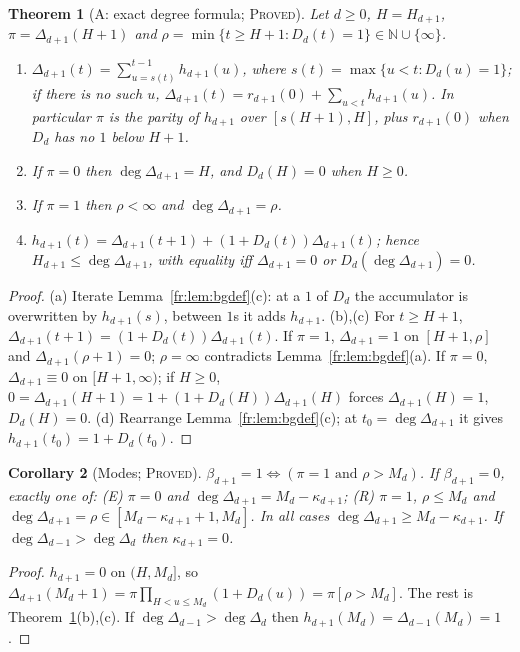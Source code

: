 \documentclass[11pt]{article}
\newtheorem{theorem}{Theorem}[section]
\newtheorem{corollary}[theorem]{Corollary}
\theoremstyle{definition}
\theoremstyle{remark}
\newcommand{\N}{\mathbb{N}}
\newcommand{\PROVED}{\textsc{Proved}}
\begin{document}
\begin{theorem}[A: exact degree formula; \PROVED]\label{fr:thm:A}
Let $d\ge0$, $H=H_{d+1}$, $\pi=\Delta_{d+1}(H+1)$ and $\rho=\min\{t\ge H+1:D_d(t)=1\}\in\N\cup\{\infty\}$.
\begin{enumerate}
\item[(a)] $\Delta_{d+1}(t)=\sum_{u=s(t)}^{t-1}h_{d+1}(u)$, where $s(t)=\max\{u<t:D_d(u)=1\}$;
if there is no such $u$, $\Delta_{d+1}(t)=r_{d+1}(0)+\sum_{u<t}h_{d+1}(u)$.
In particular $\pi$ is the parity of $h_{d+1}$ over $[s(H+1),H]$, plus $r_{d+1}(0)$ when $D_d$ has no $1$ below $H+1$.
\item[(b)] If $\pi=0$ then $\deg\Delta_{d+1}=H$, and $D_d(H)=0$ when $H\ge0$.
\item[(c)] If $\pi=1$ then $\rho<\infty$ and $\deg\Delta_{d+1}=\rho$.
\item[(d)] $h_{d+1}(t)=\Delta_{d+1}(t+1)+(1+D_d(t))\Delta_{d+1}(t)$; hence
$H_{d+1}\le\deg\Delta_{d+1}$, with equality iff $\Delta_{d+1}=0$ or $D_d(\deg\Delta_{d+1})=0$.
\end{enumerate}
\end{theorem}
\begin{proof}
(a) Iterate Lemma~\ref{fr:lem:bgdef}(c): at a $1$ of $D_d$ the accumulator is overwritten by
$h_{d+1}(s)$, between $1$s it adds $h_{d+1}$.
(b),(c) For $t\ge H+1$, $\Delta_{d+1}(t+1)=(1+D_d(t))\Delta_{d+1}(t)$.
If $\pi=1$, $\Delta_{d+1}=1$ on $[H+1,\rho]$ and $\Delta_{d+1}(\rho+1)=0$; $\rho=\infty$ contradicts
Lemma~\ref{fr:lem:bgdef}(a). If $\pi=0$, $\Delta_{d+1}\equiv0$ on $[H+1,\infty)$; if $H\ge0$,
$0=\Delta_{d+1}(H+1)=1+(1+D_d(H))\Delta_{d+1}(H)$ forces $\Delta_{d+1}(H)=1$, $D_d(H)=0$.
(d) Rearrange Lemma~\ref{fr:lem:bgdef}(c); at $t_0=\deg\Delta_{d+1}$ it gives $h_{d+1}(t_0)=1+D_d(t_0)$.
\end{proof}

\begin{corollary}[Modes; \PROVED]\label{fr:cor:modes}
$\beta_{d+1}=1\iff(\pi=1\text{ and }\rho>M_d)$. If $\beta_{d+1}=0$, exactly one of:
\textup{(E)} $\pi=0$ and $\deg\Delta_{d+1}=M_d-\kappa_{d+1}$;
\textup{(R)} $\pi=1$, $\rho\le M_d$ and $\deg\Delta_{d+1}=\rho\in[M_d-\kappa_{d+1}+1,M_d]$.
In all cases $\deg\Delta_{d+1}\ge M_d-\kappa_{d+1}$. If $\deg\Delta_{d-1}>\deg\Delta_d$ then $\kappa_{d+1}=0$.
\end{corollary}
\begin{proof}
$h_{d+1}=0$ on $(H,M_d]$, so $\Delta_{d+1}(M_d+1)=\pi\prod_{H<u\le M_d}(1+D_d(u))=\pi[\rho>M_d]$.
The rest is Theorem~\ref{fr:thm:A}(b),(c). If $\deg\Delta_{d-1}>\deg\Delta_d$ then
$h_{d+1}(M_d)=\Delta_{d-1}(M_d)=1$.
\end{proof}
\end{document}
